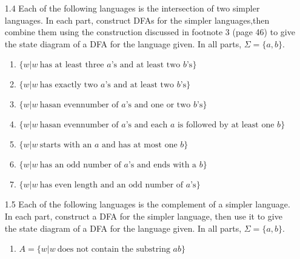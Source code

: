 \begin{enumerate}
    \item[1.4]
          Each of the following languages is the intersection of two simpler languages. In each part, construct DFAs for the simpler languages,then combine them using the construction discussed in footnote 3 (page 46) to give the state diagram of a DFA for the language given. In all parts, $\Sigma=\{a,b\}$.
          \begin{enumerate}
              \item $\{w|w~\text{has at least three }a\text{’s and at least two }b\text{’s}\}$
              \item $\{w|w~\text{has exactly two }a\text{’s and at least two }b\text{’s}\}$
              \item $\{w|w~\text{hasan evennumber of }a\text{’s and one or two }b\text{’s}\}$
              \item $\{w|w~\text{hasan evennumber of }a\text{’s and each }a\text{ is followed by at least one }b\}$
              \item $\{w|w~\text{starts with an }a\text{ and has at most one }b\}$
              \item $\{w|w~\text{has an odd number of }a\text{’s and ends with a }b\}$
              \item $\{w|w~\text{has even length and an odd number of }a\text{’s}\}$
          \end{enumerate}

    \item[1.5]
          Each of the following languages is the complement of a simpler language. In each part, construct a DFA for the simpler language, then use it to give the state diagram of a DFA for the language given. In all parts, $\Sigma=\{a,b\}$.
          \begin{enumerate}
              \item $A = \{w|w~\text{does not contain the substring }ab\}$


\end{enumerate}
\end{enumerate}
